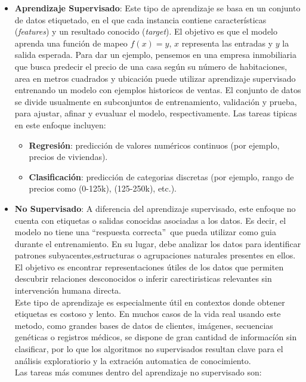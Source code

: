 \documentclass[11pt]{article} %
\begin{document}
\begin{itemize}
    \item \textbf{Aprendizaje Supervisado}: Este tipo de aprendizaje se basa en un conjunto de datos etiquetado, en el que cada instancia contiene características (\textit{features}) y un resultado conocido (\textit{target}). El objetivo es que el modelo aprenda una función de mapeo $f(x) = y$, $x$ representa las entradas y $y$ la salida esperada. Para dar un ejemplo, pensemos en una empresa inmobiliaria que busca predecir el precio de una casa según su número de habitaciones, area en metros cuadrados y ubicación puede utilizar aprendizaje supervisado entrenando un modelo con ejemplos historicos de ventas. El conjunto de datos se divide usualmente en subconjuntos de entrenamiento, validación y prueba, para ajustar, afinar y evualuar el modelo, respectivamente. Las tareas tipicas en este enfoque incluyen:
    \begin{itemize}
    \item\textbf{Regresión}: predicción de valores numéricos continuos (por ejemplo, precios de viviendas).
    \item\textbf{Clasificación}: predicción de categorias discretas (por ejemplo, rango de precios como (0-125k), (125-250k), etc.).    
    \end{itemize}
    \item \textbf{No Supervisado}: A diferencia del aprendizaje supervisado, este enfoque no cuenta con etiquetas o salidas conocidas asociadas a los datos. Es decir, el modelo no tiene una \textquotedblleft respuesta correcta\textquotedblright~que pueda utilizar como guia durante el entrenamiento. En su lugar, debe analizar los datos para identificar patrones subyacentes,estructuras o agrupaciones naturales presentes en ellos. El objetivo es encontrar representaciones útiles de los datos que permiten descubrir relaciones desconocidos o inferir carectiristicas relevantes sin intervención humana directa. \\[2pt]
    Este tipo de aprendizaje es especialmente útil en contextos donde obtener etiquetas es costoso y lento. En muchos casos de la vida real usando este metodo, como grandes bases de datos de clientes, imágenes, secuencias genéticas o registros médicos, se dispone de gran cantidad de informacíón sin clasificar, por lo que los algoritmos no supervisados resultan clave para el análisis exploratiorio y la extración automatica de conocimiento. \\[2pt]
    Las tareas más comunes dentro del aprendizaje no supervisado son:

\end{itemize}
\end{document}
